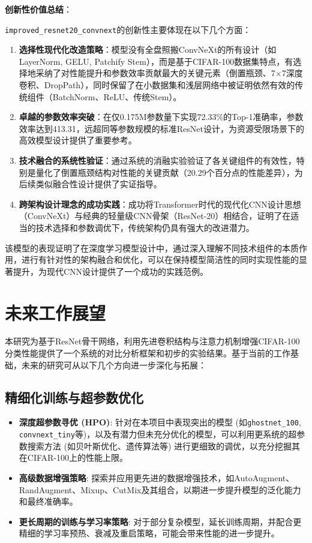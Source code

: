 \documentclass[a4paper]{article}
\begin{document}
\begin{description}
\textbf{创新性价值总结}：

\texttt{improved\_resnet20\_convnext}的创新性主要体现在以下几个方面：

\begin{enumerate}
    \item \textbf{选择性现代化改造策略}：模型没有全盘照搬ConvNeXt的所有设计（如LayerNorm, GELU, Patchify Stem），而是基于CIFAR-100数据集特点，有选择地采纳了对性能提升和参数效率贡献最大的关键元素（倒置瓶颈、7×7深度卷积、DropPath），同时保留了在小数据集和浅层网络中被证明依然有效的传统组件（BatchNorm、ReLU、传统Stem）。

    \item \textbf{卓越的参数效率突破}：在仅0.175M参数量下实现72.33\%的Top-1准确率，参数效率达到413.31，远超同等参数规模的标准ResNet设计，为资源受限场景下的高效模型设计提供了重要参考。

    \item \textbf{技术融合的系统性验证}：通过系统的消融实验验证了各关键组件的有效性，特别是量化了倒置瓶颈结构对性能的关键贡献（20.29个百分点的性能差异），为后续类似融合性设计提供了实证指导。

    \item \textbf{跨架构设计理念的成功实践}：成功将Transformer时代的现代化CNN设计思想（ConvNeXt）与经典的轻量级CNN骨架（ResNet-20）相结合，证明了在适当的技术选择和参数调优下，传统架构仍具有强大的改进潜力。
\end{enumerate}

该模型的表现证明了在深度学习模型设计中，通过深入理解不同技术组件的本质作用，进行有针对性的架构融合和优化，可以在保持模型简洁性的同时实现性能的显著提升，为现代CNN设计提供了一个成功的实践范例。

\section{未来工作展望}
本研究为基于ResNet骨干网络，利用先进卷积结构与注意力机制增强CIFAR-100分类性能提供了一个系统的对比分析框架和初步的实验结果。基于当前的工作基础，未来的研究可从以下几个方向进一步深化与拓展：

\subsection{精细化训练与超参数优化}
\begin{itemize}
    \item \textbf{深度超参数寻优 (HPO)}: 针对在本项目中表现突出的模型 (如\texttt{ghostnet\_100}, \texttt{convnext\_tiny}等)，以及有潜力但未充分优化的模型，可以利用更系统的超参数搜索方法 (如贝叶斯优化、遗传算法等) 进行更细致的调优，以充分挖掘其在CIFAR-100上的性能上限。
    \item \textbf{高级数据增强策略}: 探索并应用更先进的数据增强技术，如AutoAugment、RandAugment、Mixup、CutMix及其组合，以期进一步提升模型的泛化能力和最终准确率。
    \item \textbf{更长周期的训练与学习率策略}: 对于部分复杂模型，延长训练周期，并配合更精细的学习率预热、衰减及重启策略，可能会带来性能的进一步提升。
\end{itemize}


\end{description}
\end{document}
